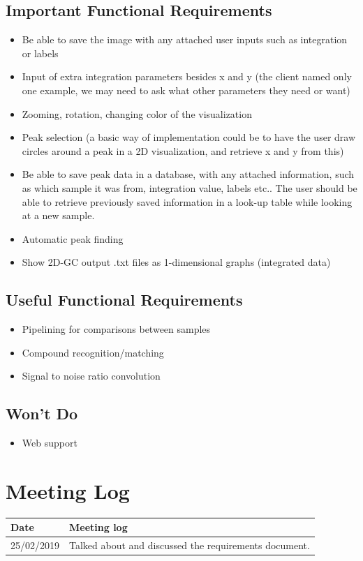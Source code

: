 \documentclass{article}
\begin{document}
\subsection*{Important Functional Requirements}
\begin{itemize}
    \item Be able to save the image with any attached user inputs such as integration or labels
	\item Input of extra integration parameters besides x and y (the client named only one example, we may need to ask what other parameters they need or want)
	\item Zooming, rotation, changing color of the visualization
	\item Peak selection (a basic way of implementation could be to have the user draw circles around a peak in a 2D visualization, and retrieve x and y from this)
    \item Be able to save peak data in a database, with any attached information, such as which sample it was from, integration value, labels etc.. The user should be able to retrieve previously saved information in a look-up table while looking at a new sample.
	\item Automatic peak finding
	\item Show 2D-GC output .txt files as 1-dimensional graphs (integrated data)
\end{itemize}

\subsection*{Useful Functional Requirements}
\begin{itemize}
	\item Pipelining for comparisons between samples
	\item Compound recognition/matching
	\item Signal to noise ratio convolution
\end{itemize}
\subsection*{Won't Do}
\begin{itemize}
	\item Web support
\end{itemize}

\section{Meeting Log}
\begin{center}
 \begin{tabular}{ | l | l | }
  \hline
  \bf{Date} & \bf{Meeting log} \\
  \hline
  25/02/2019 & Talked about and discussed the requirements document. \\
  \hline
 \end{tabular}
\end{center}
\end{document}

